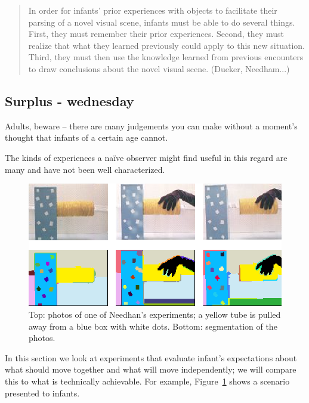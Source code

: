 \begin{quote}

In order for infants' prior experiences with objects
to facilitate their parsing of a novel visual scene,
infants must be able to do several things.  First, they
must remember their prior experiences.  Second, they 
must realize that what they learned previously could
apply to this new situation.  Third, they must then
use the knowledge learned from previous encounters
to draw conclusions about the novel visual scene.
(Dueker, Needham...)

\end{quote}



\subsection{Surplus - wednesday}


Adults, beware -- there are many judgements you can make without a
moment's thought that infants of a certain age cannot.

The kinds of experiences a na\"{i}ve observer might find
useful in this regard are many and have not been well characterized.




\begin{figure}

\centerline{\includegraphics[width=0.5\columnwidth]{fig-pull}}

\caption{
Top: photos of one of Needhan's experiments; a yellow tube is 
pulled away from a blue box with white dots.
Bottom: segmentation of the photos.
}

\label{fig:move-apart}

\end{figure}

In this section we look at experiments that evaluate infant's
expectations about what should move together and what will move
independently; we will compare this to what is technically achievable.
For example, Figure~\ref{fig:move-apart} shows a scenario presented to
infants.
